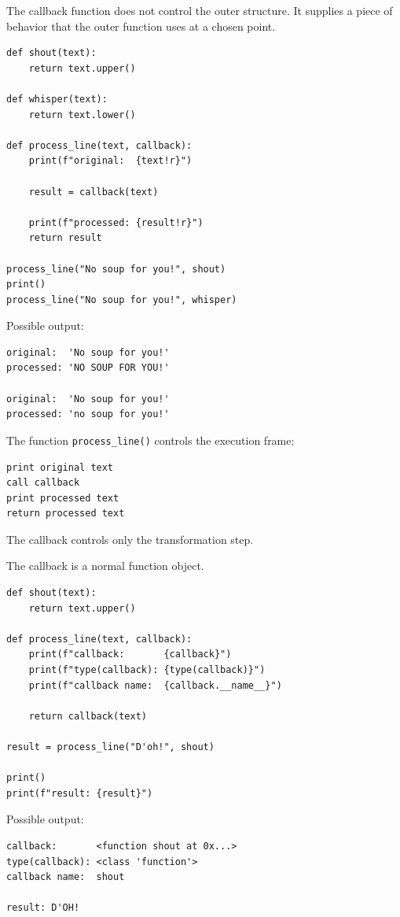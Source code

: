 The callback function does not control the outer structure. It supplies a piece of behavior that the outer function uses at a chosen point.

\begin{verbatim}
def shout(text):
    return text.upper()

def whisper(text):
    return text.lower()

def process_line(text, callback):
    print(f"original:  {text!r}")

    result = callback(text)

    print(f"processed: {result!r}")
    return result

process_line("No soup for you!", shout)
print()
process_line("No soup for you!", whisper)
\end{verbatim}

Possible output:

\begin{verbatim}
original:  'No soup for you!'
processed: 'NO SOUP FOR YOU!'

original:  'No soup for you!'
processed: 'no soup for you!'
\end{verbatim}

The function \texttt{process\_line()} controls the execution frame:

\begin{verbatim}
print original text
call callback
print processed text
return processed text
\end{verbatim}

The callback controls only the transformation step.

The callback is a normal function object.

\begin{verbatim}
def shout(text):
    return text.upper()

def process_line(text, callback):
    print(f"callback:       {callback}")
    print(f"type(callback): {type(callback)}")
    print(f"callback name:  {callback.__name__}")

    return callback(text)

result = process_line("D'oh!", shout)

print()
print(f"result: {result}")
\end{verbatim}

Possible output:

\begin{verbatim}
callback:       <function shout at 0x...>
type(callback): <class 'function'>
callback name:  shout

result: D'OH!
\end{verbatim}

